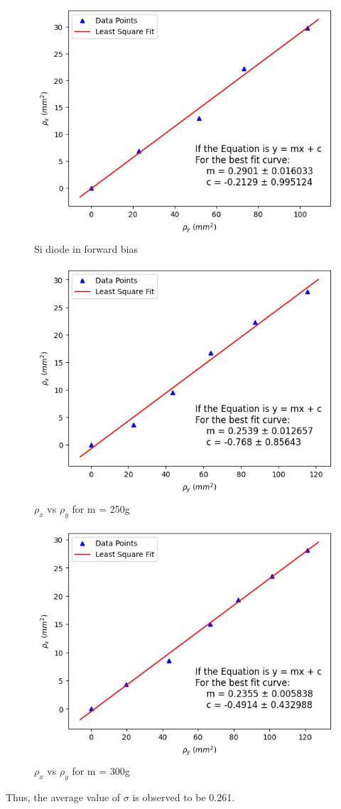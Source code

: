       \begin{figure}[H]
        \centering
        \label{graph:4}
        \includegraphics[width=0.8\columnwidth]{images/4.png}
        \caption{Si diode in forward bias}
    \end{figure}

    \begin{figure}[H]
        \centering
        \label{graph:5}
        \includegraphics[width=0.8\columnwidth]{images/5.png}
        \caption{$\rho_x$ vs $\rho_y$ for m = 250g}
    \end{figure}

    \begin{figure}[H]
        \centering
        \label{graph:6}
        \includegraphics[width=0.8\columnwidth]{images/6.png}
        \caption{$\rho_x$ vs $\rho_y$ for m = 300g}
    \end{figure}

    Thus, the average value of $\sigma$ is observed to be 0.261.